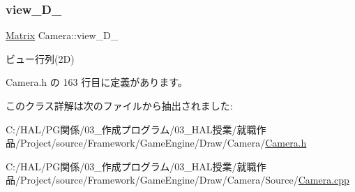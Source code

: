 \subsubsection{\texorpdfstring{view\+\_\+D\+\_\+}{view\_2D\_}}
{\footnotesize\ttfamily \mbox{\hyperlink{class_matrix}{Matrix}} Camera\+::view\+\_\+D\+\_\+\hspace{0.3cm}{\ttfamily [private]}}



ビュー行列(2\+D) 



 Camera.\+h の 163 行目に定義があります。



このクラス詳解は次のファイルから抽出されました\+:\begin{DoxyCompactItemize}
\item 
C\+:/\+H\+A\+L/\+P\+G関係/03\+\_\+作成プログラム/03\+\_\+\+H\+A\+L授業/就職作品/\+Project/source/\+Framework/\+Game\+Engine/\+Draw/\+Camera/\mbox{\hyperlink{_camera_8h}{Camera.\+h}}\item 
C\+:/\+H\+A\+L/\+P\+G関係/03\+\_\+作成プログラム/03\+\_\+\+H\+A\+L授業/就職作品/\+Project/source/\+Framework/\+Game\+Engine/\+Draw/\+Camera/\+Source/\mbox{\hyperlink{_camera_8cpp}{Camera.\+cpp}}\end{DoxyCompactItemize}
